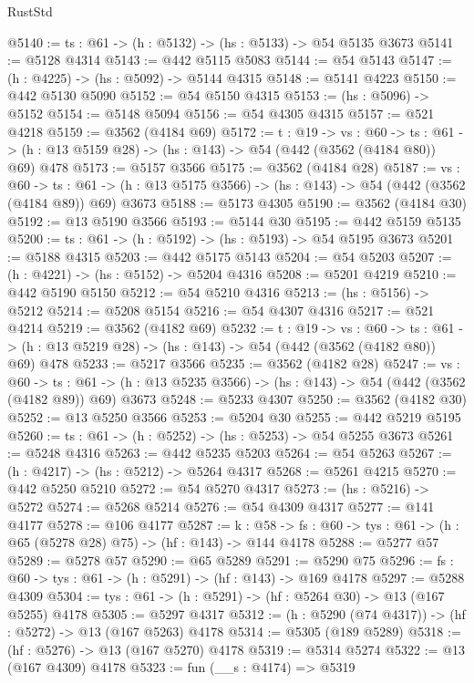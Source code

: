 \begin{lexlean}{RustStd}
\begin{coremodule}
@5140 := {ts : @61} -> (h : @5132) -> (hs : @5133) -> @54 @5135 @3673
@5141 := @5128 @4314
@5143 := @442 @5115 @5083
@5144 := @54 @5143
@5147 := (h : @4225) -> (hs : @5092) -> @5144 @4315
@5148 := @5141 @4223
@5150 := @442 @5130 @5090
@5152 := @54 @5150 @4315
@5153 := (hs : @5096) -> @5152
@5154 := @5148 @5094
@5156 := @54 @4305 @4315
@5157 := @521 @4218
@5159 := @3562 (@4184 @69)
@5172 := {t : @19} ->
  {vs : @60} ->
  {ts : @61} -> (h : @13 @5159 @28) -> (hs : @143) -> @54 (@442 (@3562 (@4184 @80)) @69) @478
@5173 := @5157 @3566
@5175 := @3562 (@4184 @28)
@5187 := {vs : @60} ->
  {ts : @61} -> (h : @13 @5175 @3566) -> (hs : @143) -> @54 (@442 (@3562 (@4184 @89)) @69) @3673
@5188 := @5173 @4305
@5190 := @3562 (@4184 @30)
@5192 := @13 @5190 @3566
@5193 := @5144 @30
@5195 := @442 @5159 @5135
@5200 := {ts : @61} -> (h : @5192) -> (hs : @5193) -> @54 @5195 @3673
@5201 := @5188 @4315
@5203 := @442 @5175 @5143
@5204 := @54 @5203
@5207 := (h : @4221) -> (hs : @5152) -> @5204 @4316
@5208 := @5201 @4219
@5210 := @442 @5190 @5150
@5212 := @54 @5210 @4316
@5213 := (hs : @5156) -> @5212
@5214 := @5208 @5154
@5216 := @54 @4307 @4316
@5217 := @521 @4214
@5219 := @3562 (@4182 @69)
@5232 := {t : @19} ->
  {vs : @60} ->
  {ts : @61} -> (h : @13 @5219 @28) -> (hs : @143) -> @54 (@442 (@3562 (@4182 @80)) @69) @478
@5233 := @5217 @3566
@5235 := @3562 (@4182 @28)
@5247 := {vs : @60} ->
  {ts : @61} -> (h : @13 @5235 @3566) -> (hs : @143) -> @54 (@442 (@3562 (@4182 @89)) @69) @3673
@5248 := @5233 @4307
@5250 := @3562 (@4182 @30)
@5252 := @13 @5250 @3566
@5253 := @5204 @30
@5255 := @442 @5219 @5195
@5260 := {ts : @61} -> (h : @5252) -> (hs : @5253) -> @54 @5255 @3673
@5261 := @5248 @4316
@5263 := @442 @5235 @5203
@5264 := @54 @5263
@5267 := (h : @4217) -> (hs : @5212) -> @5264 @4317
@5268 := @5261 @4215
@5270 := @442 @5250 @5210
@5272 := @54 @5270 @4317
@5273 := (hs : @5216) -> @5272
@5274 := @5268 @5214
@5276 := @54 @4309 @4317
@5277 := @141 @4177
@5278 := @106 @4177
@5287 := {k : @58} ->
  {fs : @60} -> {tys : @61} -> (h : @65 (@5278 @28) @75) -> (hf : @143) -> @144 @4178
@5288 := @5277 @57
@5289 := @5278 @57
@5290 := @65 @5289
@5291 := @5290 @75
@5296 := {fs : @60} -> {tys : @61} -> (h : @5291) -> (hf : @143) -> @169 @4178
@5297 := @5288 @4309
@5304 := {tys : @61} -> (h : @5291) -> (hf : @5264 @30) -> @13 (@167 @5255) @4178
@5305 := @5297 @4317
@5312 := (h : @5290 (@74 @4317)) -> (hf : @5272) -> @13 (@167 @5263) @4178
@5314 := @5305 (@189 @5289)
@5318 := (hf : @5276) -> @13 (@167 @5270) @4178
@5319 := @5314 @5274
@5322 := @13 (@167 @4309) @4178
@5323 := fun (__s : @4174) => @5319

\end{coremodule}
\end{lexlean}
